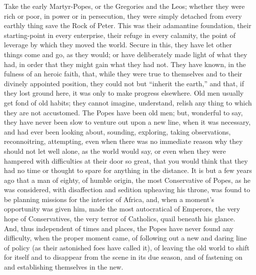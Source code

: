 Take the early Martyr-Popes, or the Gregories and the Leos; whether
they were rich or poor, in power or in persecution, they were simply
detached from every earthly thing save the Rock of Peter. This was
their adamantine foundation, their starting-point in every enterprise,
their refuge in every calamity, the point of leverage by which they
moved the world. Secure in this, they have let other things come and
go, as they would; or have deliberately made light of what they had,
in order that they might gain what they had not. They have known, in
the fulness of an heroic faith, that, while they were true to
themselves and to their divinely appointed position, they could not
but ``inherit the earth,'' and that, if they lost ground here,
it was only to make progress elsewhere. Old men usually get fond
of old habits; they cannot imagine, understand, relish any thing to
which they are not accustomed. The Popes have been old men; but,
wonderful to say, they have never been slow to venture out upon a new
line, when it was necessary, and had ever been looking about,
sounding, exploring, taking observations, reconnoitring, attempting,
even when there was no immediate reason why they should not let well
alone, as the world would say, or even when they were hampered with
difficulties at their door so great, that you would think that they
had no time or thought to spare for anything in the distance. It is
but a few years ago that a man of eighty, of humble origin, the most
Conservative of Popes, as he was considered, with disaffection and
sedition upheaving his throne, was found to be planning missions for
the interior of Africa, and, when a moment's opportunity was given
him, made the most autocratical of Emperors, the very hope of
Conservatives, the very terror of Catholics, quail beneath his glance.
And, thus independent of times and places, the Popes have never found
any difficulty, when the proper moment came, of following out a new
and daring line of policy (as their astonished foes have called it),
of leaving the old world to shift for itself and to disappear from the
scene in its due season, and of fastening on and establishing
themselves in the new.

